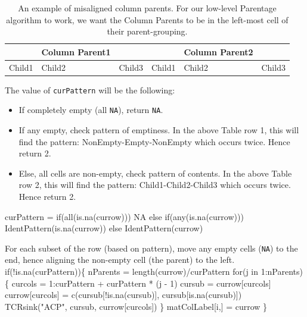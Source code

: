 \documentclass[a4paper]{article}
\begin{document}
\begin{table}[hbt]
  \centering
  \begin{tabular}{| l | l | l | l | l | l |}
    \hline
    & Column Parent1 &  & & Column Parent2 & \\
    \hline
    Child1 & Child2 & Child3 &
    Child1 & Child2 & Child3 \\
    \hline
  \end{tabular}
  \caption{An example of misaligned column parents. For our low-level
    Parentage algorithm to work, we want the Column Parents to be in
    the left-most cell of their parent-grouping.}
  \label{tab:Pare.misaligned}
\end{table}
The value of \verb|curPattern| will be the following:
\begin{itemize}
\item If completely empty (all \verb|NA|), return \verb|NA|.
\item If any empty, check pattern of emptiness. In the above Table row
  1, this will find the pattern: NonEmpty-Empty-NonEmpty which occurs
  twice. Hence return 2.
\item Else, all cells are non-empty, check pattern of contents. In the
  above Table row 2, this will find the pattern: Child1-Child2-Child3
  which occurs twice. Hence return 2.
\end{itemize}
\nwenddocs{}\endmoddef
curPattern =
  if(all(is.na(currow))) NA
  else if(any(is.na(currow))) IdentPattern(is.na(currow))
  else IdentPattern(currow)
\nwendcode{}\nwdocspar

For each subset of the row (based on pattern), move any empty cells
(\verb|NA|) to the end, hence aligning the non-empty cell (the parent)
to the left.
\nwenddocs{}\endmoddef
if(!is.na(curPattern))\{
  nParents = length(currow)/curPattern
  for(j in 1:nParents)\{
    curcols = 1:curPattern + curPattern * (j - 1)
    cursub = currow[curcols]
    currow[curcols] = c(cursub[!is.na(cursub)], cursub[is.na(cursub)])
    TCRsink("ACP", cursub, currow[curcols])
  \}
  matColLabel[i,] = currow
\}
\nwendcode{}\nwdocspar
\end{document}
